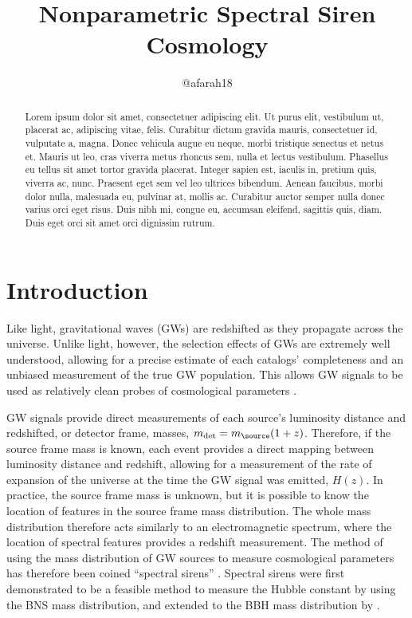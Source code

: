 \documentclass[]{aastex631}
\begin{document}
\title{Nonparametric Spectral Siren Cosmology}

\author{@afarah18}

\begin{abstract}
    Lorem ipsum dolor sit amet, consectetuer adipiscing elit.
    Ut purus elit, vestibulum ut, placerat ac, adipiscing vitae, felis.
    Curabitur dictum gravida mauris, consectetuer id, vulputate a, magna.
    Donec vehicula augue eu neque, morbi tristique senectus et netus et.
    Mauris ut leo, cras viverra metus rhoncus sem, nulla et lectus vestibulum.
    Phasellus eu tellus sit amet tortor gravida placerat.
    Integer sapien est, iaculis in, pretium quis, viverra ac, nunc.
    Praesent eget sem vel leo ultrices bibendum.
    Aenean faucibus, morbi dolor nulla, malesuada eu, pulvinar at, mollis ac.
    Curabitur auctor semper nulla donec varius orci eget risus.
    Duis nibh mi, congue eu, accumsan eleifend, sagittis quis, diam.
    Duis eget orci sit amet orci dignissim rutrum.
\end{abstract}

\section{Introduction}
\label{sec:intro}
Like light, gravitational waves (GWs) are redshifted as they propagate across the universe.
Unlike light, however, the selection effects of GWs are extremely well understood, allowing for a precise estimate of each catalogs’ completeness and an unbiased measurement of the true GW population.
This allows GW signals to be used as relatively clean probes of cosmological parameters \citep[e.g.][]{bright sirens first paper, 170817 bright siren, dark siren first paper, dark siren with 0817, hithhikers guide}.

GW signals provide direct measurements of each source’s luminosity distance and redshifted, or detector frame, masses, $m_{\det} = m_{\source}(1+z)$.
Therefore, if the source frame mass is known, each event provides a direct mapping between luminosity distance and redshift, allowing for a measurement of the rate of expansion of the universe at the time the GW signal was emitted, $H(z)$.
In practice, the source frame mass is unknown, but it is possible to know the location of features in the source frame mass distribution.
The whole mass distribution therefore acts similarly to an electromagnetic spectrum, where the location of spectral features provides a redshift measurement.
The method of using the mass distribution of GW sources to measure cosmological parameters has therefore been coined ``spectral sirens'' \citep{ezquiaga_spectral_2022}.
Spectral sirens were first demonstrated to be a feasible method to measure the Hubble constant by \cite{chernoff+fin} using the BNS mass distribution, and extended to the BBH mass distribution by \cite{farr_future_2019}.
\end{document}

